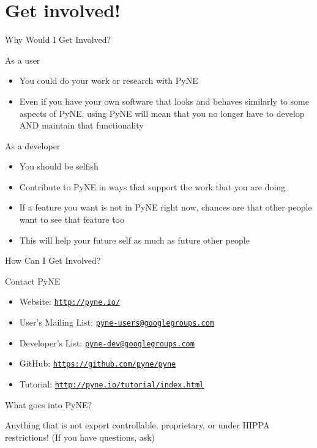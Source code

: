 \documentclass[xcolor=x11names,compress]{beamer}
\renewcommand{\(}{\begin{columns}}
\renewcommand{\)}{\end{columns}}
\newcommand{\<}[1]{\begin{column}{#1}}
\renewcommand{\>}{\end{column}}
\begin{document}
\section{Get involved!}
\begin{frame}{Why Would I Get Involved?}

    As a \textcolor{dgreen}{user} 
    \begin{itemize}
    \item You could do your work or research with PyNE
    \item Even if you have your own software that looks and behaves similarly to some aspects of PyNE, using PyNE will mean that you no longer have to develop AND maintain that functionality
    \end{itemize}        

    \vspace*{1 em}
    As a \textcolor{dgreen}{developer} 
    \begin{itemize}
    \item You should be selfish
    \item Contribute to PyNE in ways that support the work that you are doing
    \item If a feature you want is not in PyNE right now, chances are that other 
    people want to see that feature too
    \item This will help your future self as much as future other people
    \end{itemize}    

\end{frame}

\begin{frame}{How Can I Get Involved?}

    \textcolor{dgreen}{Contact PyNE}
    \begin{itemize}
    \item Website: \href{http://pyne.io/}{\texttt{http://pyne.io/}}
    
    \item User's Mailing List: \href{pyne-users@googlegroups.com}
    {\texttt{pyne-users@googlegroups.com}}
    
    \item Developer's List: \href{pyne-dev@googlegroups.com}
    {\texttt{pyne-dev@googlegroups.com}}
    
    \item GitHub: \href{https://github.com/pyne/pyne}
    {\texttt{https://github.com/pyne/pyne}}
    
    \item Tutorial: \href{http://pyne.io/tutorial/index.html}
    {\texttt{http://pyne.io/tutorial/index.html}}
    \end{itemize}
    
    \vspace*{2 em}
    \textcolor{dgreen}{What goes into PyNE?}

    Anything that is not export controllable, proprietary, 
    or under HIPPA restrictions!  (If you have questions, ask)
  
\end{frame}
\end{document}
